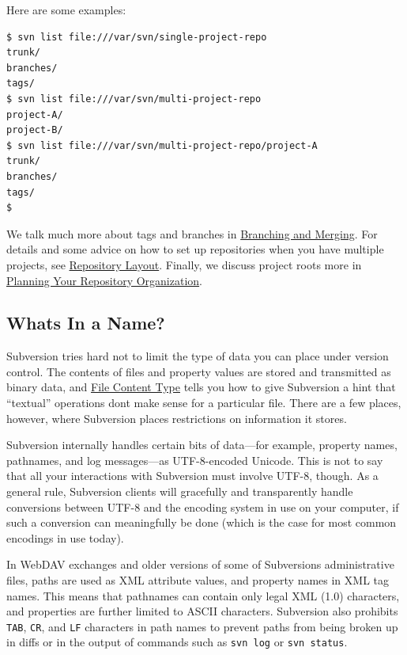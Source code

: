 Here are some examples:

\begin{verbatim}
$ svn list file:///var/svn/single-project-repo
trunk/
branches/
tags/
$ svn list file:///var/svn/multi-project-repo
project-A/
project-B/
$ svn list file:///var/svn/multi-project-repo/project-A
trunk/
branches/
tags/
$
\end{verbatim}

We talk much more about tags and branches in
\hyperref[svn.branchmerge]{Branching and Merging}. For details and some
advice on how to set up repositories when you have multiple projects,
see \hyperref[svn.branchmerge.maint.layout]{Repository Layout}. Finally,
we discuss project roots more in
\hyperref[svn.reposadmin.projects.chooselayout]{Planning Your Repository
Organization}.

\subsection{What\textquotesingle s In a
Name?}\label{svn.tour.importing.naming}

Subversion tries hard not to limit the type of data you can place under
version control. The contents of files and property values are stored
and transmitted as binary data, and
\hyperref[svn.advanced.props.special.mime-type]{File Content Type} tells
you how to give Subversion a hint that ``textual'' operations
don\textquotesingle t make sense for a particular file. There are a few
places, however, where Subversion places restrictions on information it
stores.

Subversion internally handles certain bits of data---for example,
property names, pathnames, and log messages---as UTF-8-encoded Unicode.
This is not to say that all your interactions with Subversion must
involve UTF-8, though. As a general rule, Subversion clients will
gracefully and transparently handle conversions between UTF-8 and the
encoding system in use on your computer, if such a conversion can
meaningfully be done (which is the case for most common encodings in use
today).

In WebDAV exchanges and older versions of some of
Subversion\textquotesingle s administrative files, paths are used as XML
attribute values, and property names in XML tag names. This means that
pathnames can contain only legal XML (1.0) characters, and properties
are further limited to ASCII characters. Subversion also prohibits
\texttt{TAB}, \texttt{CR}, and \texttt{LF} characters in path names to
prevent paths from being broken up in diffs or in the output of commands
such as \texttt{svn\ log} or \texttt{svn\ status}.

